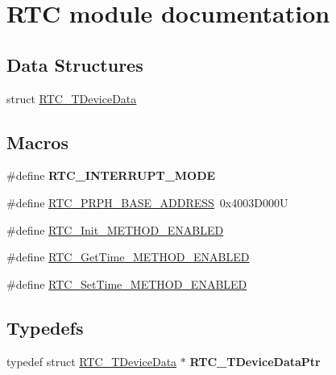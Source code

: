 \hypertarget{group___r_t_c__module}{}\section{R\+TC module documentation}
\label{group___r_t_c__module}
\subsection*{Data Structures}
\begin{DoxyCompactItemize}
\item 
struct \hyperlink{struct_r_t_c___t_device_data}{R\+T\+C\+\_\+\+T\+Device\+Data}
\end{DoxyCompactItemize}
\subsection*{Macros}
\begin{DoxyCompactItemize}
\item 
\mbox{\label{group___r_t_c__module_ga0228b44f59884f72420f9e0fcbed6105}} 
\#define {\bfseries R\+T\+C\+\_\+\+I\+N\+T\+E\+R\+R\+U\+P\+T\+\_\+\+M\+O\+DE}
\item 
\#define \hyperlink{group___r_t_c__module_gaed4d12db83d7558ef7b713084d0a488e}{R\+T\+C\+\_\+\+P\+R\+P\+H\+\_\+\+B\+A\+S\+E\+\_\+\+A\+D\+D\+R\+E\+SS}~0x4003\+D000U
\item 
\#define \hyperlink{group___r_t_c__module_ga2359447ebbc6d08d33a8ee6ce53ab22d}{R\+T\+C\+\_\+\+Init\+\_\+\+M\+E\+T\+H\+O\+D\+\_\+\+E\+N\+A\+B\+L\+ED}
\item 
\#define \hyperlink{group___r_t_c__module_ga28e10bb5b6a4946d27063f0f989ea136}{R\+T\+C\+\_\+\+Get\+Time\+\_\+\+M\+E\+T\+H\+O\+D\+\_\+\+E\+N\+A\+B\+L\+ED}
\item 
\#define \hyperlink{group___r_t_c__module_ga89cd8bb411583901f1c1a0e76ca5d9de}{R\+T\+C\+\_\+\+Set\+Time\+\_\+\+M\+E\+T\+H\+O\+D\+\_\+\+E\+N\+A\+B\+L\+ED}
\end{DoxyCompactItemize}
\subsection*{Typedefs}
\begin{DoxyCompactItemize}
\item 
\mbox{\label{group___r_t_c__module_ga2d46b13f640ab9067847478c963e9338}} 
typedef struct \hyperlink{struct_r_t_c___t_device_data}{R\+T\+C\+\_\+\+T\+Device\+Data} $\ast$ {\bfseries R\+T\+C\+\_\+\+T\+Device\+Data\+Ptr}
\end{DoxyCompactItemize}
